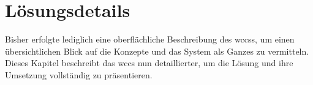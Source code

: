 \chapter{Lösungsdetails}
    \label{chapter:SolutionDetails}
    Bisher erfolgte lediglich eine oberflächliche Beschreibung des \glspl{wccs},
    um einen übersichtlichen Blick auf die Konzepte und das System als Ganzes
    zu vermitteln.
    Dieses Kapitel beschreibt das \gls{wccs} nun detaillierter,
    um die Lösung und ihre Umsetzung vollständig zu präsentieren.


    
